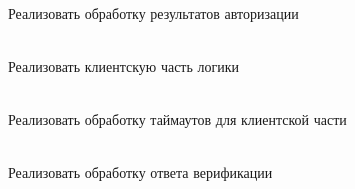 \begin{DoxyRefList}
\item[Member \doxylink{class_g_n_e_t_1_1_user_login2_ac662ac896d30d4f07db6a465fbb20ca3}{GNET\+::User\+Login2\+::Post\+Process} (Manager\+::\+Session\+::\+ID proxy\+\_\+sid, const Octets\+Stream \&os\+Arg, const Octets\+Stream \&os\+Res)]\hfill \\
\label{todo__todo000043}%
%
Реализовать обработку результатов авторизации  
\item[Member \doxylink{class_g_n_e_t_1_1_user_logout_a3367c6ce9755247ab27fd85957a50ebf}{GNET\+::User\+Logout\+::Client} (Rpc\+::\+Data \texorpdfstring{$\ast$}{*}argument, Rpc\+::\+Data \texorpdfstring{$\ast$}{*}result, Manager \texorpdfstring{$\ast$}{*}manager, Manager\+::\+Session\+::\+ID sid)]\hfill \\
\label{todo__todo000045}%
%
Реализовать клиентскую часть логики  
\item[Member \doxylink{class_g_n_e_t_1_1_user_logout_ae14b8440e018c0aabe72b1843f292753}{GNET\+::User\+Logout\+::On\+Timeout} ()]\hfill \\
\label{todo__todo000046}%
%
Реализовать обработку таймаутов для клиентской части  
\item[Member \doxylink{class_g_n_e_t_1_1_verify_master___re_a549010699fc4534896e58ff3aef11b9d}{GNET\+::Verify\+Master\+\_\+\+Re\+::Process} (Manager \texorpdfstring{$\ast$}{*}manager, Manager\+::\+Session\+::\+ID sid)]\hfill \\
\label{todo__todo000047}%
%
Реализовать обработку ответа верификации 
\end{DoxyRefList}